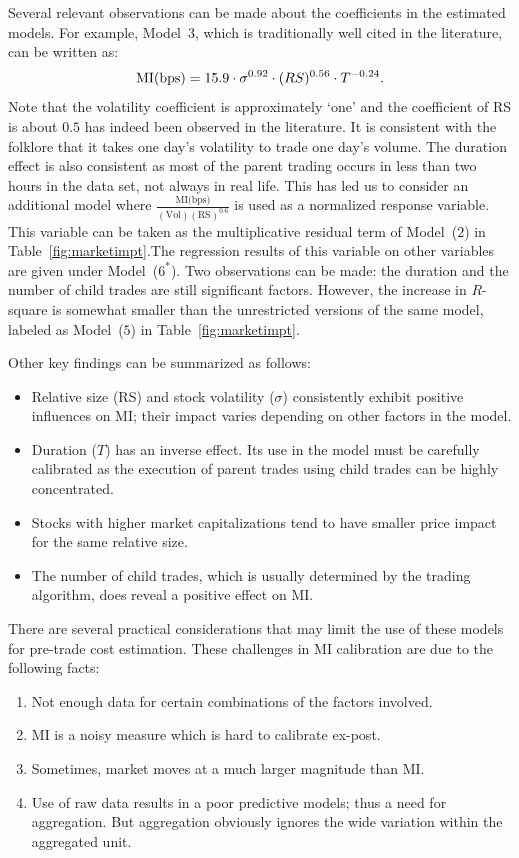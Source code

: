 Several relevant observations can be made about the coefficients in the estimated models. For example, Model~$3$, which is traditionally well cited in the literature, can be written as:
	\[
	\text{MI(\text{bps})}= 15.9 \cdot \sigma^{0.92} \cdot(RS)^{0.56} \cdot T^{-0.24}.
	\]
Note that the volatility coefficient is approximately `one' and the coefficient of RS is about $0.5$ has indeed been observed in the literature. It is consistent with the folklore that it takes one day's volatility to trade one day's volume. The duration effect is also consistent as most of the parent trading occurs in less than two hours in the data set, not always in real life. This has led us to consider an additional model where $\frac{\text{MI(bps)}}{(\text{Vol})(\text{RS})^{0.6}}$ is used as a normalized response variable. This variable can be taken as the multiplicative residual term of Model~($2$) in Table~\ref{fig:marketimpt}.The regression results of this variable on other variables are given under Model~($6^*$). Two observations can be made: the duration and the number of child trades are still significant factors. However, the increase in $R$-square is somewhat smaller than the unrestricted versions of the same model, labeled as Model~($5$) in Table~\ref{fig:marketimpt}.


Other key findings can be summarized as follows:
        \begin{itemize}
        \item Relative size (RS) and stock volatility ($\sigma$) consistently exhibit positive influences on MI; their impact varies depending on other factors in the model.
        \item Duration ($T$) has an inverse effect. Its use in the model must be carefully calibrated as the execution of parent trades using child trades can be highly concentrated.
        \item Stocks with higher market capitalizations tend to have smaller price impact for the same relative size.
        \item The number of child trades, which is usually determined by the trading algorithm, does reveal a positive effect on MI.
        \end{itemize}
There are several practical considerations that may limit the use of these models for pre-trade cost estimation. These challenges in MI calibration are due to the following facts:
	\begin{enumerate}[--]
	\item Not enough data for certain combinations of the factors involved.
	\item MI is a noisy measure which is hard to calibrate ex-post.
	\item Sometimes, market moves at a much larger magnitude than MI.
	\item Use of raw data results in a poor predictive models; thus a need for aggregation. But aggregation obviously ignores the wide variation within the aggregated unit. 
	\end{enumerate}